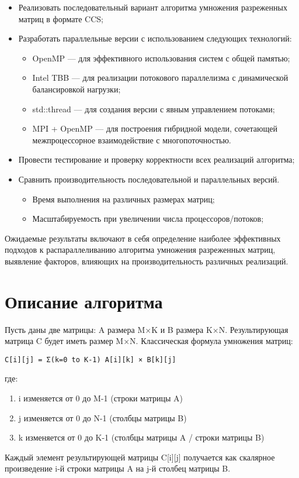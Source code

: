 \documentclass[12pt]{article}
\begin{document}
\begin{itemize}
\item Реализовать последовательный вариант алгоритма умножения разреженных матриц в формате CCS;
\item Разработать параллельные версии с использованием следующих технологий:
\begin{itemize}
\item OpenMP — для эффективного использования систем с общей памятью;
\item Intel TBB — для реализации потокового параллелизма с динамической балансировкой нагрузки;
\item std::thread — для создания версии с явным управлением потоками;
\item MPI + OpenMP — для построения гибридной модели, сочетающей межпроцессорное взаимодействие с многопоточностью.
\end{itemize}
\item Провести тестирование и проверку корректности всех реализаций алгоритма;
\item Сравнить производительность последовательной и параллельных версий.
\begin{itemize}
\item Время выполнения на различных размерах матриц;
\item Масштабируемость при увеличении числа процессоров/потоков;
\end{itemize}
\end{itemize}

Ожидаемые результаты включают в себя определение наиболее эффективных подходов к распараллеливанию алгоритма умножения разреженных матриц, выявление факторов, влияющих на производительность различных реализаций.

\section{Описание алгоритма}

Пусть даны две матрицы: A размера M×K и B размера K×N. Результирующая матрица C будет иметь размер M×N.
Классическая формула умножения матриц:
\begin{lstlisting}
C[i][j] = Σ(k=0 to K-1) A[i][k] × B[k][j]
\end{lstlisting}
где:
\begin{enumerate}
\item i изменяется от 0 до M-1 (строки матрицы A)
\item j изменяется от 0 до N-1 (столбцы матрицы B)
\item k изменяется от 0 до K-1 (столбцы матрицы A / строки матрицы B)
\end{enumerate}
Каждый элемент результирующей матрицы C[i][j] получается как скалярное произведение i-й строки матрицы A на j-й столбец матрицы B.
\end{document}
